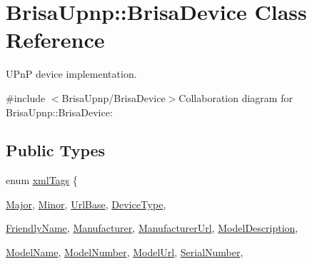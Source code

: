 \hypertarget{classBrisaUpnp_1_1BrisaDevice}{
\section{BrisaUpnp::BrisaDevice Class Reference}
\label{classBrisaUpnp_1_1BrisaDevice}
}


UPnP device implementation.  


{\ttfamily \#include $<$BrisaUpnp/BrisaDevice$>$}Collaboration diagram for BrisaUpnp::BrisaDevice:\subsection*{Public Types}
\begin{DoxyCompactItemize}
\item 
enum \hyperlink{classBrisaUpnp_1_1BrisaDevice_a4c9c16e6c1aa08b4e9ca5b81a26abca1}{xmlTags} \{ \par
\hyperlink{classBrisaUpnp_1_1BrisaDevice_a4c9c16e6c1aa08b4e9ca5b81a26abca1aa9555a4b3d0e13e0d4c7af00b8497e50}{Major}, 
\hyperlink{classBrisaUpnp_1_1BrisaDevice_a4c9c16e6c1aa08b4e9ca5b81a26abca1a727cf9b9dfccf8ecb49f351472020d8a}{Minor}, 
\hyperlink{classBrisaUpnp_1_1BrisaDevice_a4c9c16e6c1aa08b4e9ca5b81a26abca1af14b11483d1e4073ff83e34038ee5af1}{UrlBase}, 
\hyperlink{classBrisaUpnp_1_1BrisaDevice_a4c9c16e6c1aa08b4e9ca5b81a26abca1ac276a705e67914a953369e35b55975f5}{DeviceType}, 
\par
\hyperlink{classBrisaUpnp_1_1BrisaDevice_a4c9c16e6c1aa08b4e9ca5b81a26abca1ab4b1b6a68f472a7299a0662d5fd53c7b}{FriendlyName}, 
\hyperlink{classBrisaUpnp_1_1BrisaDevice_a4c9c16e6c1aa08b4e9ca5b81a26abca1a4201a03a83ad5352ae7c23d661fa4a6e}{Manufacturer}, 
\hyperlink{classBrisaUpnp_1_1BrisaDevice_a4c9c16e6c1aa08b4e9ca5b81a26abca1a89814883256ded14786e17879fc4b211}{ManufacturerUrl}, 
\hyperlink{classBrisaUpnp_1_1BrisaDevice_a4c9c16e6c1aa08b4e9ca5b81a26abca1a76e08e0db9ee6753c3d9675bdfc88a68}{ModelDescription}, 
\par
\hyperlink{classBrisaUpnp_1_1BrisaDevice_a4c9c16e6c1aa08b4e9ca5b81a26abca1ab5b3c9509905ef2449bb7f95d0e7277c}{ModelName}, 
\hyperlink{classBrisaUpnp_1_1BrisaDevice_a4c9c16e6c1aa08b4e9ca5b81a26abca1a9a40e263436a6276fb2efbdd6c27cbec}{ModelNumber}, 
\hyperlink{classBrisaUpnp_1_1BrisaDevice_a4c9c16e6c1aa08b4e9ca5b81a26abca1aa134ae669b57005d958f694b34541cf0}{ModelUrl}, 
\hyperlink{classBrisaUpnp_1_1BrisaDevice_a4c9c16e6c1aa08b4e9ca5b81a26abca1a5a083c0742a184e99e4bb998e04645b6}{SerialNumber}, 
\par

\end{DoxyCompactItemize}
